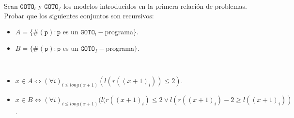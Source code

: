 \documentclass[twoside]{article}
\begin{document}
\begin{ejercicio}{3}
Sean $\texttt{GOTO}_l$ y $\texttt{GOTO}_f$ los modelos introducidos en la primera relación de problemas.
Probar que los siguientes conjuntos son recursivos:
\begin{itemize}
\item $A = \{\#(\texttt{p}) : \texttt{p}$ es un $\texttt{GOTO}_l-$programa$\}$.
\item $B = \{\#(\texttt{p}) : \texttt{p}$ es un $\texttt{GOTO}_f-$programa$\}$.
\end{itemize}
\end{ejercicio}
\begin{solucion}\
\begin{itemize}
\item $x\in A\Leftrightarrow (\forall i)_{i\leq long(x+1)} (l(r((x+1)_i))\leq 2)$.
\item $x\in B\Leftrightarrow (\forall i)_{i\leq long(x+1)} (l(r((x+1)_i)\leq 2\lor l(r((x+1)_i)-2\geq l((x+1)_i))$.
\end{itemize}
\end{solucion}

\newpage
\end{document}
